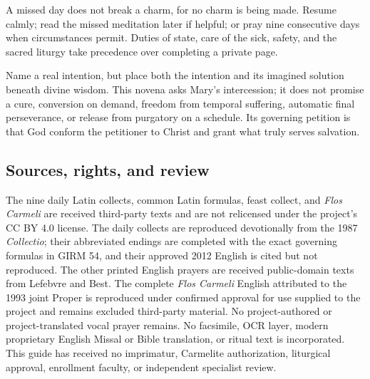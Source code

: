 A missed day does not break a charm, for no charm is being made. Resume calmly; read the missed meditation later if helpful; or pray nine consecutive days when circumstances permit. Duties of state, care of the sick, safety, and the sacred liturgy take precedence over completing a private page.

Name a real intention, but place both the intention and its imagined solution beneath divine wisdom. This novena asks Mary's intercession; it does not promise a cure, conversion on demand, freedom from temporal suffering, automatic final perseverance, or release from purgatory on a schedule. Its governing petition is that God conform the petitioner to Christ and grant what truly serves salvation.

\subsection{Sources, rights, and review}

The nine daily Latin collects, common Latin formulas, feast collect, and \textit{Flos Carmeli} are received third-party texts and are not relicensed under the project's CC BY 4.0 license. The daily collects are reproduced devotionally from the 1987 \textit{Collectio}; their abbreviated endings are completed with the exact governing formulas in GIRM 54, and their approved 2012 English is cited but not reproduced. The other printed English prayers are received public-domain texts from Lefebvre and Best. The complete \textit{Flos Carmeli} English attributed to the 1993 joint Proper is reproduced under confirmed approval for use supplied to the project and remains excluded third-party material. No project-authored or project-translated vocal prayer remains. No facsimile, OCR layer, modern proprietary English Missal or Bible translation, or ritual text is incorporated. This guide has received no imprimatur, Carmelite authorization, liturgical approval, enrollment faculty, or independent specialist review.
